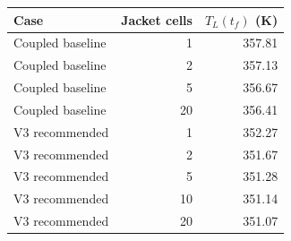\begin{tabular}{lrr}
\toprule
Case & Jacket cells & $T_L(t_f)$ (K) \\
\midrule
Coupled baseline & 1 & 357.81 \\
Coupled baseline & 2 & 357.13 \\
Coupled baseline & 5 & 356.67 \\
Coupled baseline & 20 & 356.41 \\
V3 recommended & 1 & 352.27 \\
V3 recommended & 2 & 351.67 \\
V3 recommended & 5 & 351.28 \\
V3 recommended & 10 & 351.14 \\
V3 recommended & 20 & 351.07 \\
\bottomrule
\end{tabular}
